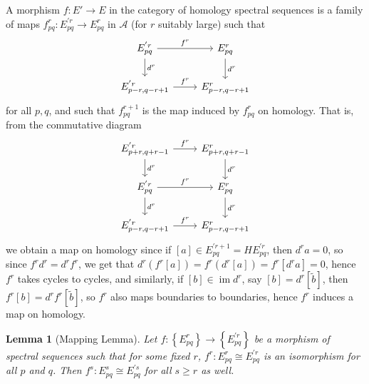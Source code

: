 \documentclass[reqno]{amsart}
\newtheorem{lemma}[theorem]{Lemma}
\theoremstyle{definition}
\theoremstyle{remark}
\DeclareMathOperator{\im}{im}
\begin{document}
    A morphism $f \colon E' \to E$ in the category
    of homology spectral sequences is a family
    of maps $f_{pq}^{r} \colon
    E_{pq}^{'r} \to E_{pq}^{r}$ in $\mathcal{A}$ 
    (for $r$ suitably large) such that
    \begin{equation*}
    \begin{tikzcd}
        E_{pq}^{'r} \ar[r, "f^{r}"] \ar[d, "d^{r}"] & E_{pq}^{r}
        \ar[d, "d^{r}"] \\
        E_{p-r, q-r+1}^{'r} \ar[r, "f^{r}"] & E_{p-r,q-r+1}^{r}
    \end{tikzcd}
    \end{equation*}
    for all $p,q$, and such that
    $f_{pq}^{r+1}$ is the map induced
    by $f_{pq}^{r}$ on homology. That is, from the 
    commutative diagram
    \begin{equation*}
    \begin{tikzcd}
        E_{p+r,q+r-1}^{'r} \ar[r, "f^{r}"] \ar[d, "d^{r}"]
        & E_{p+r,q+r-1}^{r}
        \ar[d, "d^{r}"]\\
        E_{pq}^{'r} \ar[r, "f^{r}"] \ar[d, "d^{r}"] & E_{pq}^{r}
        \ar[d, "d^{r}"] \\
        E_{p-r, q-r+1}^{'r} \ar[r, "f^{r}"] & E_{p-r,q-r+1}^{r}
    \end{tikzcd}
    \end{equation*}
    we obtain a map on
    homology since if 
    $\left[ a \right] \in 
    E_{pq}^{'r+1} = H E_{pq}^{'r}$, then
    $d^{r}a = 0$, so
    since  $f^{r} d^{r} = d^{r} f^{r}$, we get
    that $d^{r} \left( f^{r} \left[ a \right]  \right) 
    = f^{r} \left( d^{r} \left[ a \right]  \right) 
    = f^{r} \left[ d^{r} a \right] = 0$, hence
    $f^{r}$ takes cycles to cycles, and
    similarly,
    if $\left[ b \right] \in \im
    d^{r}$, say $\left[ b \right]  = 
    d^{r}\left[ \tilde{b} \right] 
    $, then
    $f^{r} \left[ b \right] =
    d^{r} f^{r} \left[ \tilde{b} \right] $, so
    $f^{r}$ also maps boundaries to boundaries, hence
    $f^{r}$ induces a map on homology.

    
    \begin{lemma}[Mapping Lemma]
        Let $f \colon \left\{ E_{pq}^{r} \right\} \to 
        \left\{ E_{pq}^{'r} \right\} $ be a morphism
        of spectral sequences such that for some
        fixed $r$, $f^{r} \colon
        E_{pq}^{r} \cong E_{pq}^{'r}$ is an isomorphism
        for all $p$ and $q$. Then
        $f^{s} \colon E_{pq}^{s} \cong
        E_{pq}^{'s}$ for all $s\ge r$ as well.
    \end{lemma}
\end{document}
